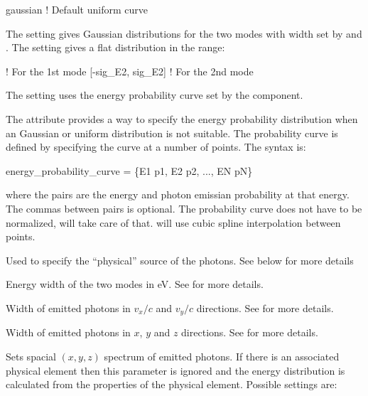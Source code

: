{\begin{description}
\begin{example}
  gaussian   ! Default
  uniform
  curve
\end{example}
The  setting gives Gaussian distributions for the two modes with width set by
 and . The  setting gives a flat distribution in the range:
\begin{example}
      ! For the 1st mode
  [-sig_E2, sig_E2]  ! For the 2nd mode
\end{example}
The  setting uses the energy probability curve set by the 
component.
%
  \item[\vn{energy_probability_curve}] \Newline
The  attribute provides a way to specify the energy probability
distribution when an Gaussian or uniform distribution is not suitable. The probability curve is
defined by specifying the curve at a number of points. The syntax is:
\begin{example}
  energy_probability_curve = \{E1 p1, E2 p2, ..., EN pN\}
\end{example}
where the  pairs are the energy and photon emissian probability at that energy. 
The commas between  pairs is optional.
The probability curve does not have to be normalized, \bmad will take care of that. \bmad will
use cubic spline interpolation between points. 
%
  \item[\vn{physical_source}] \Newline
Used to specify the ``physical'' source of the photons. See below for more details
%
  \item[\vn{sig_E}, \vn{sig_E2}] \Newline
Energy width of the two modes in eV. See  for more details.
%
  \item[\vn{sig_vx, sig_vy}] \Newline
Width of emitted photons in $v_x/c$ and $v_y/c$ directions. See
 for more details.
%
  \item[\vn{sig_x, sig_y, sig_z}] \Newline
Width of emitted photons in $x$, $y$ and $z$ directions. See
 for more details.
%
  \item[\vn{spatial_distribution}] \Newline
Sets spacial $(x, y, z)$ spectrum of emitted photons. If there is an associated physical element
then this parameter is ignored and the energy distribution is calculated from the properties of the
physical element. Possible settings are:

\end{description}}
